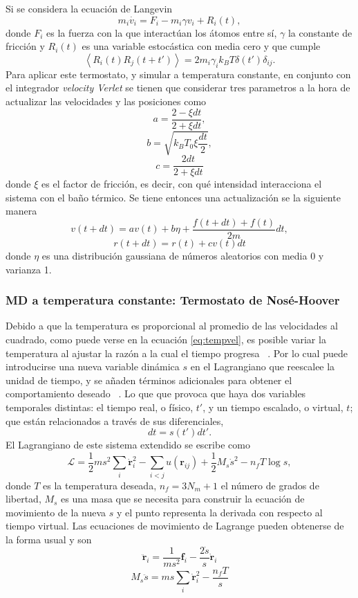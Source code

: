 Si se considera la ecuación de Langevin \cite{schneider1978}
\begin{equation}\label{eq:langevin}
    m_i \dot{v_i} = F_i - m_i \gamma v_i + R_i(t),
\end{equation}
donde $F_i$ es la fuerza con la que interactúan los átomos entre sí, $\gamma$ la
constante de fricción y $R_i(t)$ es una variable estocástica con media cero 
y que cumple
$$
\left\langle R_i(t) R_j(t+t') \right\rangle = 2m_i \gamma_i k_B T \delta(t') \delta_{ij}.
$$
Para aplicar este termostato, y simular a temperatura constante, en conjunto con 
el integrador \textit{velocity Verlet} se tienen que considerar tres parametros
\cite{kroger2005} a la hora de actualizar las velocidades y las posiciones como
$$
a = \frac{2 - \xi dt}{2 + \xi dt},
$$
$$
b= \sqrt{k_B T_0 \xi \frac{dt}{2}},
$$
$$
c= \frac{2 dt}{2 + \xi dt}
$$
donde $\xi$ es el factor de fricción, es decir, con qué intensidad interacciona 
el sistema con el baño térmico. Se tiene entonces una actualización se la siguiente
manera
$$
v(t+dt) = a v(t) + b \eta + \frac{f(t+dt)+f(t)}{2m} dt,
$$
$$
r(t+dt) = r(t) + c v(t) dt
$$
donde $\eta$ es una distribución gaussiana de números aleatorios con media 0 y
varianza 1. 

\subsubsection{MD a temperatura constante: Termostato de Nosé-Hoover}

Debido a que la temperatura es proporcional al promedio de las velocidades al 
cuadrado, como puede verse en la ecuación \ref{eq:tempvel}, es posible variar
la temperatura al ajustar la razón a la cual el tiempo progresa 
~\cite{nose1984a}. Por lo cual puede introducirse una nueva variable dinámica
$s$ en el Lagrangiano que reescalee la unidad de tiempo, y se añaden términos 
adicionales para obtener el comportamiento deseado ~\cite{rapaport2004}. Lo que 
que provoca que haya dos variables temporales distintas: el tiempo real, o físico, 
$t'$, y un tiempo escalado, o virtual, $t$; que están relacionados a través de 
sus diferenciales,
$$
dt = s(t') dt'.
$$
El Lagrangiano de este sistema extendido se escribe como
$$
\mathcal{L} = \frac{1}{2} m s^2 \sum_i \dot{\mathbf{r}}_i^2 - \sum_{i<j} u(\mathbf{r}_{ij}) + \frac{1}{2} M_s \dot{s}^2 - n_f T \log s,
$$
donde $T$ es la temperatura deseada, $n_f = 3N_m + 1$ el número de grados de 
libertad, $M_s$ es una masa que se necesita para construir la ecuación de 
movimiento de la nueva  $s$ y el punto representa la derivada
con respecto al tiempo virtual. Las ecuaciones de movimiento de Lagrange pueden 
obtenerse de la forma usual y son
$$
\ddot{\mathbf{r}}_i = \frac{1}{m s^2} \mathbf{f}_i - \frac{2 \dot{s}}{s} \dot{\mathbf{r}}_i
$$
$$
M_s \ddot{s} = m s \sum_i \dot{\mathbf{r}}_i^2 - \frac{n_f T}{s}
$$

